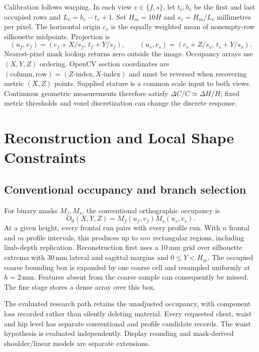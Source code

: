 \documentclass[11pt,a4paper]{article}
\begin{document}
Calibration follows warping. In each view $v\in\{f,s\}$, let $t_v,b_v$ be the first and last occupied rows and $L_v=b_v-t_v+1$. Set $H_m=10H$ and $s_v=H_m/L_v$ millimetres per pixel. The horizontal origin $c_v$ is the equally weighted mean of nonempty-row silhouette midpoints. Projection is
\begin{equation}
 (u_f,v_f)=(c_f+X/s_f,\,t_f+Y/s_f),\qquad
 (u_s,v_s)=(c_s+Z/s_s,\,t_s+Y/s_s).
 \label{eq:projection}
\end{equation}
Nearest-pixel mask lookup returns zero outside the image. Occupancy arrays use $(X,Y,Z)$ ordering. OpenCV section coordinates are $(\text{column},\text{row})=(Z\text{-index},X\text{-index})$ and must be reversed when recovering metric $(X,Z)$ points. Supplied stature is a common scale input to both views. Continuous geometric measurements therefore satisfy $\Delta C/C\simeq\Delta H/H$; fixed metric thresholds and voxel discretization can change the discrete response.

\section{Reconstruction and Local Shape Constraints}
\subsection{Conventional occupancy and branch selection}
For binary masks $M_f,M_s$, the conventional orthographic occupancy is
\begin{equation}
 O_0(X,Y,Z)=M_f(u_f,v_f)M_s(u_s,v_s).
 \label{eq:hull}
\end{equation}
At a given height, every frontal run pairs with every profile run. With $n$ frontal and $m$ profile intervals, this produces up to $nm$ rectangular regions, including limb-depth replication. Reconstruction first uses a 10\,mm grid over silhouette extrema with 30\,mm lateral and sagittal margins and $0\leq Y<H_m$. The occupied coarse bounding box is expanded by one coarse cell and resampled uniformly at $h=2$\,mm. Features absent from the coarse sample can consequently be missed. The fine stage stores a dense array over this box.

The evaluated research path retains the unadjusted occupancy, with component loss recorded rather than silently deleting material. Every requested chest, waist and hip level has separate conventional and profile candidate records. The waist hypothesis is evaluated independently. Display rounding and mask-derived shoulder/linear models are separate extensions.
\end{document}
